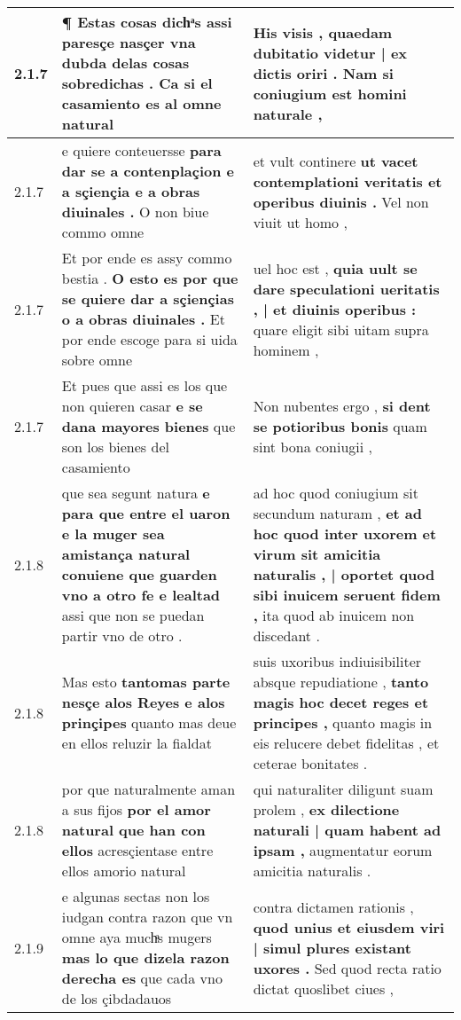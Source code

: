 \begin{tabular}{|p{1cm}|p{6.5cm}|p{6.5cm}|}
2.1.7 & ¶ Estas cosas dichͣs \textbf{ assi paresçe nasçer vna dubda delas cosas sobredichas . } Ca si el casamiento es al omne natural & His visis , \textbf{ quaedam dubitatio videtur | ex dictis oriri . } Nam si coniugium est homini naturale , \\\hline
2.1.7 & e quiere conteuersse \textbf{ para dar se a contenplaçion e a sçiençia e a obras diuinales . } O non biue commo omne & et vult continere \textbf{ ut vacet contemplationi veritatis et operibus diuinis . } Vel non viuit ut homo , \\\hline
2.1.7 & Et por ende es assy commo bestia . \textbf{ O esto es por que se quiere dar a sçiençias o a obras diuinales . } Et por ende escoge para si uida sobre omne & uel hoc est , \textbf{ quia uult se dare speculationi ueritatis , | et diuinis operibus : } quare eligit sibi uitam supra hominem , \\\hline
2.1.7 & Et pues que assi es los que non quieren casar \textbf{ e se dana mayores bienes } que son los bienes del casamiento & Non nubentes ergo , \textbf{ si dent se potioribus bonis } quam sint bona coniugii , \\\hline
2.1.8 & que sea segunt natura \textbf{ e para que entre el uaron e la muger sea amistança natural conuiene que guarden vno a otro fe e lealtad } assi que non se puedan partir vno de otro . & ad hoc quod coniugium sit secundum naturam , \textbf{ et ad hoc quod inter uxorem et virum sit amicitia naturalis , | oportet quod sibi inuicem seruent fidem , } ita quod ab inuicem non discedant . \\\hline
2.1.8 & Mas esto \textbf{ tantomas parte nesçe alos Reyes e alos prinçipes } quanto mas deue en ellos reluzir la fialdat & suis uxoribus indiuisibiliter absque repudiatione , \textbf{ tanto magis hoc decet reges et principes , } quanto magis in eis relucere debet fidelitas , et ceterae bonitates . \\\hline
2.1.8 & por que naturalmente aman a sus fijos \textbf{ por el amor natural que han con ellos } acresçientase entre ellos amorio natural & qui naturaliter diligunt suam prolem , \textbf{ ex dilectione naturali | quam habent ad ipsam , } augmentatur eorum amicitia naturalis . \\\hline
2.1.9 & e algunas sectas non los iudgan contra razon que vn omne aya muchͣs mugers \textbf{ mas lo que dizela razon derecha es } que cada vno de los çibdadauos & contra dictamen rationis , \textbf{ quod unius et eiusdem viri | simul plures existant uxores . } Sed quod recta ratio dictat quoslibet ciues , \\\hline

\end{tabular}
